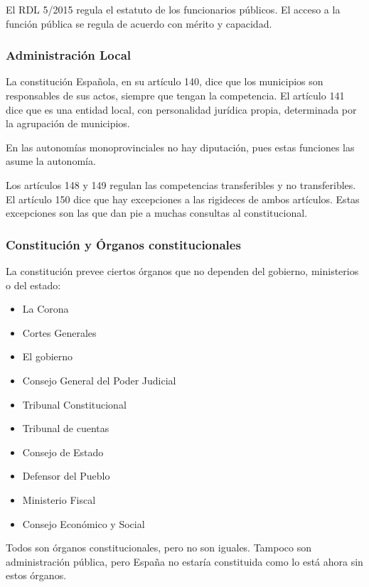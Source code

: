     El RDL 5/2015 regula el estatuto de los funcionarios públicos. El acceso a la función pública se regula de acuerdo con mérito y capacidad.

\subsubsection{Administración Local}
    La constitución Española, en su artículo 140, dice que los municipios son responsables de sus actos, siempre que tengan la competencia. El artículo 141 dice que es una entidad local, con personalidad jurídica propia, determinada por la agrupación de municipios.

    En las autonomías monoprovinciales no hay diputación, pues estas funciones las asume la autonomía.

    \noindent{}

    Los artículos 148 y 149 regulan las competencias transferibles y no transferibles. El artículo 150 dice que hay excepciones a las rigideces de ambos artículos. Estas excepciones son las que dan pie a muchas consultas al constitucional.

\subsubsection{Constitución y Órganos constitucionales}
    La constitución prevee ciertos órganos que no dependen del gobierno, ministerios o del estado:
    \begin{itemize}
        \item La Corona
        \item Cortes Generales
        \item El gobierno
        \item Consejo General del Poder Judicial
        \item Tribunal Constitucional
        \item Tribunal de cuentas
        \item Consejo de Estado
        \item Defensor del Pueblo
        \item Ministerio Fiscal
        \item Consejo Económico y Social
    \end{itemize}

    Todos son órganos constitucionales, pero no son iguales. Tampoco son administración pública, pero España no estaría constituida como lo está ahora sin estos órganos.

